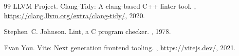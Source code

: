 \documentclass[12pt,a4paper]{report}
\begin{document}
\begin{thebibliography}{99}
LLVM Project.
\newblock Clang-Tidy: A clang-based C++ linter tool.
, \url{https://clang.llvm.org/extra/clang-tidy/}, 2020.

Stephen~C. Johnson.
\newblock Lint, a C program checker.
, 1978.

Evan You.
\newblock Vite: Next generation frontend tooling.
, \url{https://vitejs.dev/}, 2021.

\end{thebibliography}
\end{document}
